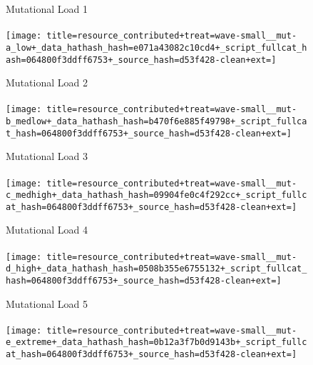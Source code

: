 \begin{sidewaysfigure*}
\begin{center}
\hspace{1ex}
\begin{subfigure}[b]{0.1825\linewidth}
  \centering
  Mutational Load 1\\~\\
  \texttt{[image: title=resource\_contributed+treat=wave-small\_\_mut-a\_low+\_data\_hathash\_hash=e071a43082c10cd4+\_script\_fullcat\_hash=064800f3ddff6753+\_source\_hash=d53f428-clean+ext=]}
\end{subfigure}
\hspace{1ex}
\begin{subfigure}[b]{0.1825\linewidth}
  \centering
  Mutational Load 2\\~\\
  \texttt{[image: title=resource\_contributed+treat=wave-small\_\_mut-b\_medlow+\_data\_hathash\_hash=b470f6e885f49798+\_script\_fullcat\_hash=064800f3ddff6753+\_source\_hash=d53f428-clean+ext=]}
\end{subfigure}
\hspace{1ex}
\begin{subfigure}[b]{0.1825\linewidth}
  \centering
  Mutational Load 3\\~\\
  \texttt{[image: title=resource\_contributed+treat=wave-small\_\_mut-c\_medhigh+\_data\_hathash\_hash=09904fe0c4f292cc+\_script\_fullcat\_hash=064800f3ddff6753+\_source\_hash=d53f428-clean+ext=]}
\end{subfigure}
\hspace{1ex}
\begin{subfigure}[b]{0.1825\linewidth}
  \centering
  Mutational Load 4\\~\\
  \texttt{[image: title=resource\_contributed+treat=wave-small\_\_mut-d\_high+\_data\_hathash\_hash=0508b355e6755132+\_script\_fullcat\_hash=064800f3ddff6753+\_source\_hash=d53f428-clean+ext=]}
\end{subfigure}
\hspace{1ex}
\begin{subfigure}[b]{0.1825\linewidth}
  \centering
  Mutational Load 5\\~\\
  \texttt{[image: title=resource\_contributed+treat=wave-small\_\_mut-e\_extreme+\_data\_hathash\_hash=0b12a3f7b0d9143b+\_script\_fullcat\_hash=064800f3ddff6753+\_source\_hash=d53f428-clean+ext=]}
\end{subfigure}\\
\vspace{5ex}


\end{center}
\end{sidewaysfigure*}
